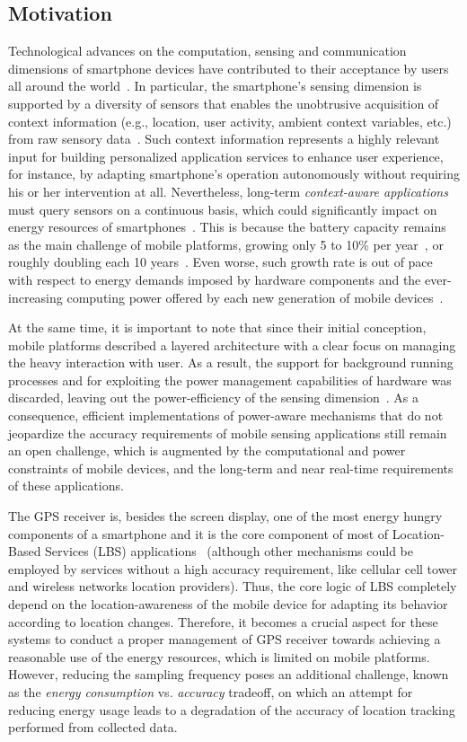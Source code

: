 \documentclass[ENG,PhD]{cinvestav}
\begin{document}
\subsection{Motivation}
Technological advances on the computation, sensing and communication dimensions of smartphone devices have contributed to their acceptance by users all around the world~\cite{Campbell2012}.
In particular, the smartphone's sensing dimension is supported by a diversity of sensors that enables the unobtrusive acquisition of context information (e.g., location, user activity, ambient context variables, etc.) from raw sensory data~\cite{Lane2010}.
Such context information represents a highly relevant input for building personalized application services to enhance user experience, for instance, by adapting smartphone's operation autonomously without requiring his or her intervention at all.
Nevertheless, long-term \emph{context-aware applications} must query sensors on a continuous basis, which could significantly impact on energy resources of smartphones~\cite{Macias2013}.
This is because the battery capacity remains as the main challenge of mobile platforms, growing only 5 to 10\% per year~\cite{Ma2012,Evarts2015}, or roughly doubling each 10 years~\cite{Tom2015}.
Even worse, such growth rate is out of pace with respect to energy demands imposed by hardware components and the ever-increasing computing power offered by each new generation of mobile devices~\cite{Yurur2015}.

At the same time, it is important to note that since their initial conception, mobile platforms described a layered architecture with a clear focus on managing the heavy interaction with user.
As a result, the support for background running processes and for exploiting the power management capabilities of hardware was discarded, leaving out the power-efficiency of the sensing dimension~\cite{Priyantha2011}.
As a consequence, efficient implementations of power-aware mechanisms that do not jeopardize the accuracy requirements of mobile sensing applications still remain an open challenge, which is augmented by the computational and power constraints of mobile devices, and the long-term and near real-time requirements of these applications.

The GPS receiver is, besides the screen display, one of the most energy hungry components of a smartphone and it is the core component of most of Location-Based Services (LBS) applications~\cite{Perez-Torres2016} (although other mechanisms could be employed by services without a high accuracy requirement, like cellular cell tower and wireless networks location providers).
Thus, the core logic of LBS completely depend on the location-awareness of the mobile device for adapting its behavior according to location changes.
Therefore, it becomes a crucial aspect for these systems to conduct a proper management of GPS receiver towards achieving a reasonable use of the energy resources, which is limited on mobile platforms.
However, reducing the sampling frequency poses an additional challenge, known as the \emph{energy consumption} vs. \emph{accuracy} tradeoff, on which an attempt for reducing energy usage leads to a degradation of the accuracy of location tracking performed from collected data.
\end{document}
